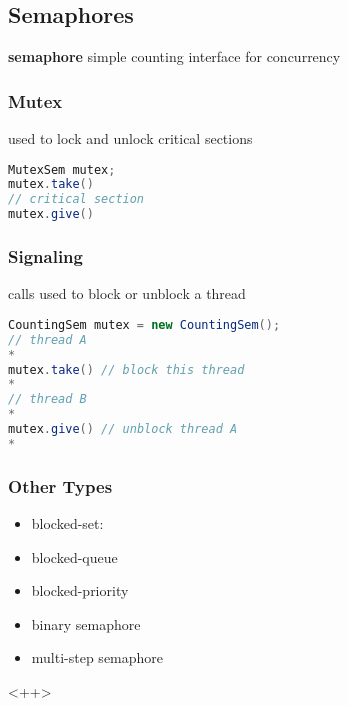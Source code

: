 \documentclass[]{article}
\theoremstyle{definition}
\begin{document}
	\subsection{Semaphores}
	\textbf{semaphore} simple counting interface for concurrency
	\subsubsection{Mutex}
	used to lock and unlock critical sections
	\begin{lstlisting}[language=Java]
MutexSem mutex;
mutex.take()
// critical section
mutex.give()
	\end{lstlisting}
	\subsubsection{Signaling}
	calls used to block or unblock a thread
	\begin{lstlisting}[language=Java]
CountingSem mutex = new CountingSem();
// thread A
*
mutex.take() // block this thread
*
// thread B
*
mutex.give() // unblock thread A
*
	\end{lstlisting}

	\subsubsection{Other Types}
	\begin{itemize}
		\item blocked-set: 
		\item blocked-queue
		\item blocked-priority
		\item binary semaphore
		\item multi-step semaphore
	\end{itemize}<++>




	
\end{document}
